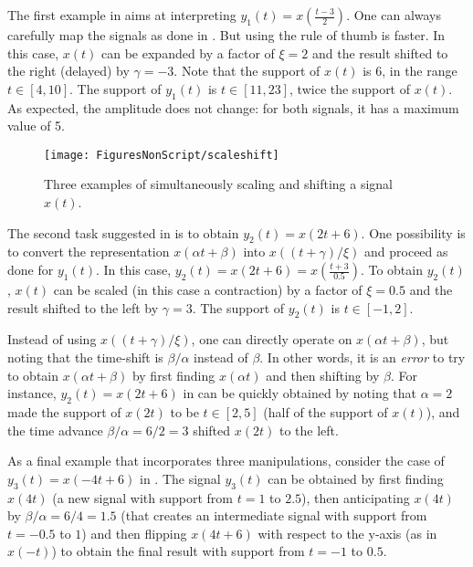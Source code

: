 The first example in  aims at interpreting
$y_1(t)=x\left(\frac{t-3}{2}\right)$. 
One can always carefully map the signals as done in . But using the rule of thumb is faster.
In this case, $x(t)$ can be expanded by a factor of $\xi=2$ and the result shifted to the right (delayed) by $\gamma = -3$.
Note that the support of $x(t)$ is 6, in the range $t \in [4,10]$. The support of $y_1(t)$ is $t \in [11, 23]$, 
twice the support of $x(t)$. As expected, the amplitude does not change: for both signals, it has a maximum value of 5.

\begin{figure}
	\centering
		\texttt{[image: FiguresNonScript/scaleshift]}
	\caption{Three examples of simultaneously scaling and shifting a signal $x(t)$.\label{fig:scaleshift}}
\end{figure}

The second task suggested in  is to obtain $y_2(t)=x(2t+6)$. One possibility is to convert the
representation $x(\alpha t + \beta)$ 
into $x( (t + \gamma) / \xi)$ and proceed as done for $y_1(t)$. In this case, $y_2(t)=x(2t+6)=x\left(\frac{t+3}{0.5}\right)$.
To obtain $y_2(t)$, $x(t)$ can be scaled (in this case a contraction) by a factor of $\xi=0.5$ and the result shifted to the left by $\gamma = 3$. The support of $y_2(t)$ is $t \in [-1, 2]$.

Instead of using $x( (t + \gamma) / \xi)$, one can directly operate on $x(\alpha t + \beta)$, but noting that the time-shift is $\beta/\alpha$ instead of $\beta$. 
In other words, it is an \emph{error} to try to obtain $x(\alpha t + \beta)$ by first finding $x(\alpha t)$ and then shifting by $\beta$.
For instance, $y_2(t)=x(2t+6)$ in  can be quickly obtained by noting that $\alpha=2$ made the support of $x(2t)$ to be $t \in [2, 5]$ (half of the support of $x(t)$), and the time advance $\beta/\alpha = 6/2 = 3$ shifted $x(2t)$ to the left.

As a final example that incorporates three manipulations, consider the case of $y_3(t)=x(-4 t + 6)$ in . The signal $y_3(t)$ can be obtained
by first finding $x(4t)$ (a new signal with support from $t=1$ to $2.5$), then anticipating $x(4t)$ by $\beta/\alpha = 6/4 = 1.5$  (that creates an intermediate signal with support from $t=-0.5$ to $1$) and then flipping $x(4t+6)$ with respect to the y-axis (as in $x(-t)$) to obtain the final result with support from $t=-1$ to $0.5$.

